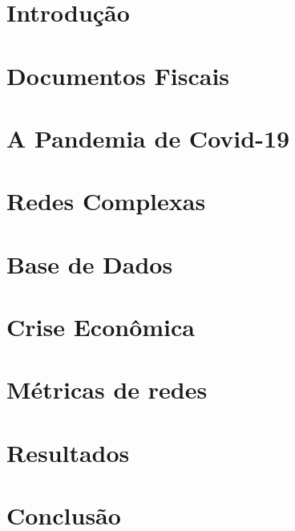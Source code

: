 \documentclass[mestrado, pre-defesa]{packages/icmc}
\begin{document}
\textual

\chapter{Introdução}
\label{chapter:introducao}


\chapter{Documentos Fiscais}
\label{chapter:documenos-fiscais}


\chapter{A Pandemia de Covid-19}
\label{chapter:pandemia}


\chapter{Redes Complexas}
\label{chapter:redes}


\chapter{Base de Dados}
\label{chapter:base-de-dados}


\chapter{Crise Econômica}
\label{chapter:crise-economica}


\chapter{Métricas de redes}
\label{chapter:metricas-redes}


\chapter{Resultados}
\label{chapter:resultados}


\chapter{Conclusão}
\label{chapter:conclusão}

\end{document}
